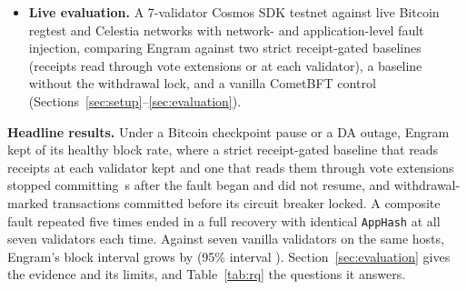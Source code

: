 \begin{itemize}
    specification. Bounded model checking of the Tendermint-style layer (safety) and
    the FSM layer (safety and liveness) found no violation within their bounds (the Tendermint-style layer at $N{\le}4$ and $f{=}1$; the FSM layer at the thresholds of Table~\ref{tab:formal-config}, not the deployed ones); the largest
    run explored \resFSMStatesM{} distinct states. In an ablation study of the
    protocol's safety mechanisms, removing each mechanism makes the invariant that guards it fail, which shows that the invariants detect the removal and not that the mechanisms are sufficient. The refinement of the composed layer to the abstract
    consensus object is specified but open (Section~\ref{sec:formal}).
    \item \textbf{Live evaluation.} A 7-validator Cosmos SDK testnet against
    live Bitcoin regtest and Celestia networks with network- and
    application-level fault injection, comparing Engram against two strict receipt-gated
    baselines (receipts read through vote extensions or at each validator), a
    baseline without the withdrawal lock, and a vanilla CometBFT control
    (Sections~\ref{sec:setup}--\ref{sec:evaluation}).
\end{itemize}

\textbf{Headline results.} Under a Bitcoin checkpoint pause or a DA outage, Engram
kept \resRQTwoEngram{} of its healthy block rate, where a strict receipt-gated
baseline that reads receipts at each validator kept \resRQTwoOob{} and one that reads them through
vote extensions stopped committing \resInBandHalt\,s after the fault began and did not resume, and \resExposure{} withdrawal-marked
transactions committed before its circuit breaker locked. A composite fault repeated
five times ended in a full recovery with identical \texttt{AppHash} at all seven
validators each time. Against seven vanilla validators on the same hosts, Engram's
block interval grows by \resOverheadPct{} (95\% interval \resOverheadCI{}).
Section~\ref{sec:evaluation} gives the evidence and its limits, and
Table~\ref{tab:rq} the questions it answers.

